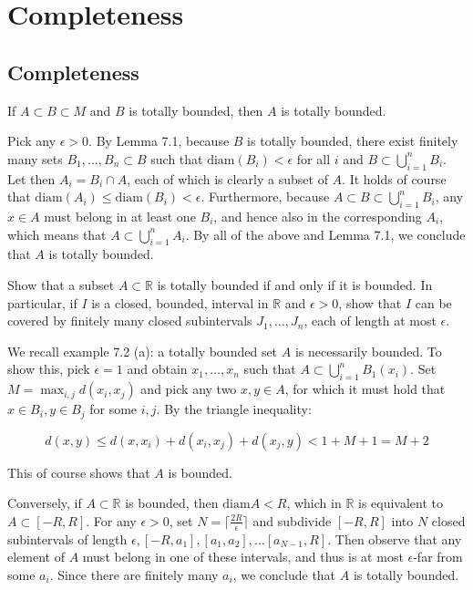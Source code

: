 \chapter{Completeness}

\section{Completeness}

\begin{exercise}{1}
    If $A \subset B \subset M$ and \(B\) is totally bounded, then \(A\) is totally bounded.
\end{exercise}

\begin{solution}
    
    Pick any $\epsilon > 0$.
    By Lemma 7.1, because $B$ is totally bounded, there exist finitely many sets $B_1, \ldots, B_n \subset B$ such that $\text{diam}(B_i) < \epsilon$ for all $i$ and $B \subset \bigcup_{i=1}^{n} B_i$.
    Let then $A_i = B_i \cap A$, each of which is clearly a subset of $A$.
    It holds of course that $\text{diam}(A_i) \leq \text{diam}(B_i) < \epsilon$.
    Furthermore, because $A \subset B \subset \bigcup_{i=1}^{n} B_i$, any $x \in A$ must belong in at least one $B_i$, and hence also in the corresponding $A_i$, which means that $A \subset \bigcup_{i=1}^{n} A_i$.
    By all of the above and Lemma 7.1, we conclude that $A$ is totally bounded.
\end{solution}

\begin{exercise}{2}
    Show that a subset $A \subset \mathbb{R}$ is totally bounded if and only if it is bounded.
    In particular, if $I$ is a closed, bounded, interval in $\mathbb{R}$ and $\epsilon > 0$, show that $I$ can be covered by finitely many closed subintervals $J_1, \ldots, J_n$, each of length at most $\epsilon$.
\end{exercise}

\begin{solution}

    We recall example 7.2 (a): a totally bounded set $A$ is necessarily bounded.
    To show this, pick $\epsilon = 1$ and obtain $x_1, \ldots, x_n$ such that $A \subset \bigcup_{i=1}^{n} B_1(x_i)$.
    Set $M = \max_{i, j} d(x_i, x_j)$ and pick any two $x, y \in A$, for which it must hold that $x \in B_i, y \in B_j$ for some $i, j$.
    By the triangle inequality:

    \[d(x, y) \leq d(x, x_i) + d(x_i, x_j) + d(x_j, y) < 1 + M + 1 = M + 2\]

    This of course shows that $A$ is bounded.
    
    Conversely, if $A \subset \mathbb{R}$ is bounded, then $\text{diam} A < R$, which in $\mathbb{R}$ is equivalent to $A \subset [-R, R]$.
    For any $\epsilon > 0$, set $N = \lceil \frac{2R}{\epsilon} \rceil$ and subdivide $[-R, R]$ into $N$ closed subintervals of length $\epsilon, [-R, a_1], [a_1, a_2], \ldots [a_{N-1}, R]$.
    Then observe that any element of $A$ must belong in one of these intervals, and thus is at most $\epsilon$-far from some $a_i$.
    Since there are finitely many $a_i$, we conclude that $A$ is totally bounded.
\end{solution}

